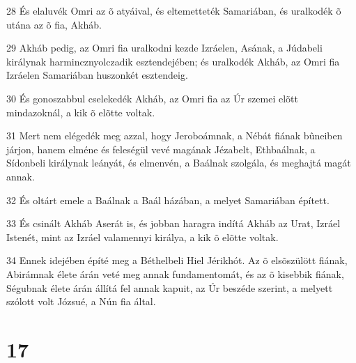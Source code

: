 \par 28 És elaluvék Omri az õ atyáival, és eltemetteték Samariában, és uralkodék õ utána az õ fia, Akháb.
\par 29 Akháb pedig, az Omri fia uralkodni kezde Izráelen, Asának, a Júdabeli királynak harmincznyolczadik esztendejében; és uralkodék Akháb, az Omri fia Izráelen Samariában huszonkét esztendeig.
\par 30 És gonoszabbul cselekedék Akháb, az Omri fia az Úr szemei elõtt mindazoknál, a kik õ elõtte voltak.
\par 31 Mert nem elégedék meg azzal, hogy Jeroboámnak, a Nébát fiának bûneiben járjon, hanem elméne és feleségül vevé magának Jézabelt, Ethbaálnak, a Sídonbeli királynak leányát, és elmenvén, a Baálnak szolgála, és meghajtá magát annak.
\par 32 És oltárt emele a Baálnak a Baál házában, a melyet Samariában épített.
\par 33 És csinált Akháb Aserát is, és jobban haragra indítá Akháb az Urat, Izráel Istenét, mint az Izráel valamennyi királya, a kik õ elõtte voltak.
\par 34 Ennek idejében építé meg a Béthelbeli Hiel Jérikhót. Az õ elsõszülött fiának, Abirámnak élete árán veté meg annak fundamentomát, és az õ kisebbik fiának, Ségubnak élete árán állítá fel annak kapuit, az Úr beszéde szerint, a melyett szólott volt Józsué, a Nún fia által.

\chapter{17}

